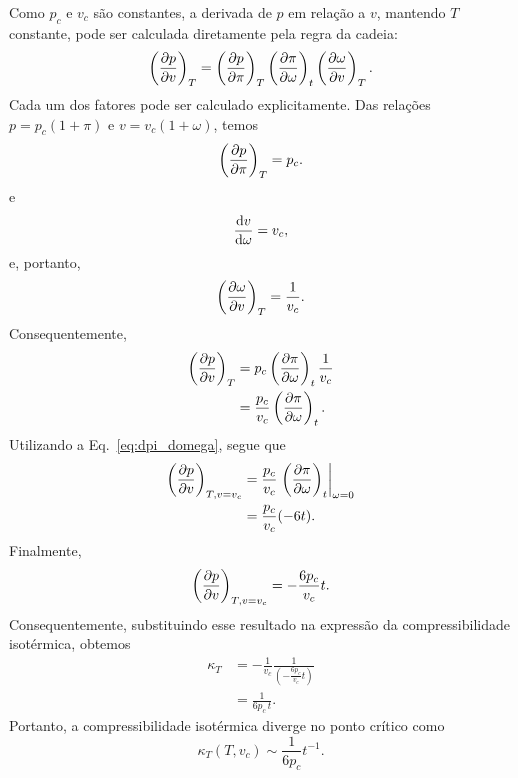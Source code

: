 \documentclass[11pt,a4paper]{article}
\begin{document}
%
Como $p_c$ e $v_c$ são constantes, a derivada de $p$ em relação a $v$,
mantendo $T$ constante, pode ser calculada diretamente pela regra da
cadeia:
%
\begin{equation}
    \left(\pdv{p}{v}\right)_T
    =
    \left(\pdv{p}{\pi}\right)_T
    \left(\pdv{\pi}{\omega}\right)_t
    \left(\pdv{\omega}{v}\right)_T.
\end{equation}
%
Cada um dos fatores pode ser calculado explicitamente. Das relações
$p=p_c(1+\pi)$ e $v=v_c(1+\omega)$, temos
%
\begin{equation}
    \left(\pdv{p}{\pi}\right)_T=p_c.
\end{equation}
%
e
%
\begin{equation}
    \dv{v}{\omega}=v_c,
\end{equation}
%
e, portanto,
%
\begin{equation}
    \left(\pdv{\omega}{v}\right)_T
    =
    \frac{1}{v_c}.
\end{equation}
%
Consequentemente,
%
\begin{align}
    \left(\pdv{p}{v}\right)_T
    &=
    p_c
    \left(\pdv{\pi}{\omega}\right)_t
    \frac{1}{v_c}
    \nonumber\\
    &=
    \frac{p_c}{v_c}
    \left(\pdv{\pi}{\omega}\right)_t.
\label{eq:p_and_pi_partial}    
\end{align}
%
Utilizando a Eq.~\eqref{eq:dpi_domega}, segue que
%
\begin{align}
    \left(\pdv{p}{v}\right)_{T,v=v_c}
    &=
    \frac{p_c}{v_c}
    \left.
    \left(\pdv{\pi}{\omega}\right)_t
    \right|_{\omega=0}
    \nonumber\\
    &=
    \frac{p_c}{v_c}(-6t).
\end{align}
%
Finalmente,
%
\begin{equation}
    \left(\pdv{p}{v}\right)_{T,v=v_c}
    =
    -\frac{6p_c}{v_c}t.
\label{eq:dpdv_critical}
\end{equation}
%
Consequentemente, substituindo esse resultado na expressão da compressibilidade isotérmica, obtemos
%
\begin{align}
    \kappa_T
    &=
    -\frac{1}{v_c}
    \frac{1}{
    (-\frac{6p_c}{v_c}t)
    }
    \nonumber\\
    &=
    \frac{1}{6p_c\,t}.
\end{align}
%
Portanto, a compressibilidade isotérmica diverge no ponto crítico como
%
\begin{equation}
    \boxed{
    \kappa_T(T,v_c)
    \sim
    \frac{1}{6p_c}t^{-1}.
    }
\end{equation}
\end{document}
